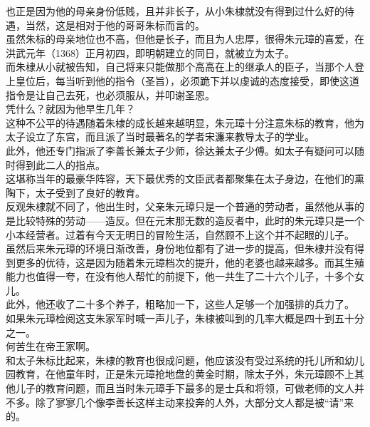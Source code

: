 \begin{multicols}{\theparacolNo}
也正是因为他的母亲身份低贱，且并非长子，从小朱棣就没有得到过什么好的待遇，当然，这是相对于他的哥哥朱标而言的。\\

虽然朱标的母亲地位也不高，但他是长子，而且为人忠厚，很得朱元璋的喜爱，在洪武元年（1368）正月初四，即明朝建立的同日，就被立为太子。\\

而朱棣从小就被告知，自己将来只能做那个高高在上的继承人的臣子，当那个人登上皇位后，每当听到他的指令（圣旨），必须跪下并以虔诚的态度接受，即使这道指令是让自己去死，也必须服从，并叩谢圣恩。\\

凭什么？就因为他早生几年？\\

这种不公平的待遇随着朱棣的成长越来越明显，朱元璋十分注意朱标的教育，他为太子设立了东宫，而且派了当时最著名的学者宋濂来教导太子的学业。\\

此外，他还专门指派了李善长兼太子少师，徐达兼太子少傅。如太子有疑问可以随时得到此二人的指点。\\

这堪称当年的最豪华阵容，天下最优秀的文臣武者都聚集在太子身边，在他们的熏陶下，太子受到了良好的教育。\\

反观朱棣就不同了，他出生时，父亲朱元璋只是一个普通的劳动者，虽然他从事的是比较特殊的劳动——造反。但在元末那无数的造反者中，此时的朱元璋只是一个小本经营者。过着有今天无明日的冒险生活，自然顾不上这个并不起眼的儿子。\\

虽然后来朱元璋的环境日渐改善，身份地位都有了进一步的提高，但朱棣并没有得到更多的优待，这是因为随着朱元璋档次的提升，他的老婆也越来越多。而其生殖能力也值得一夸，在没有他人帮忙的前提下，他一共生了二十六个儿子，十多个女儿。\\

此外，他还收了二十多个养子，粗略加一下，这些人足够一个加强排的兵力了。\\

如果朱元璋检阅这支朱家军时喊一声儿子，朱棣被叫到的几率大概是四十到五十分之一。\\

何苦生在帝王家啊。\\

和太子朱标比起来，朱棣的教育也很成问题，他应该没有受过系统的托儿所和幼儿园教育，在他童年时，正是朱元璋抢地盘的黄金时期，除太子外，朱元璋顾不上其他儿子的教育问题，而且当时朱元璋手下最多的是士兵和将领，可做老师的文人并不多。除了寥寥几个像李善长这样主动来投奔的人外，大部分文人都是被“请”来的。\\


\end{multicols}
